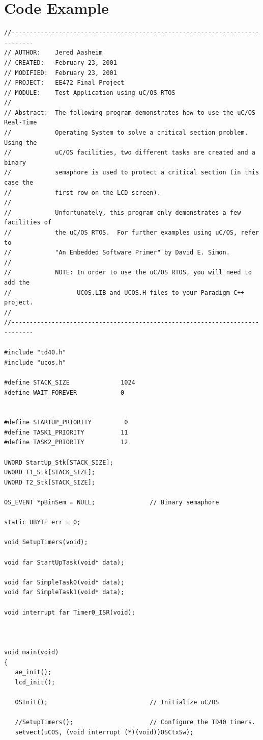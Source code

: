 \documentclass{article}	%
\begin{document}
\section{Code Example}
\begin{verbatim}
//----------------------------------------------------------------------------
// AUTHOR:    Jered Aasheim
// CREATED:   February 23, 2001
// MODIFIED:  February 23, 2001
// PROJECT:   EE472 Final Project
// MODULE:    Test Application using uC/OS RTOS
//
// Abstract:  The following program demonstrates how to use the uC/OS Real-Time
//            Operating System to solve a critical section problem.  Using the
//            uC/OS facilities, two different tasks are created and a binary
//            semaphore is used to protect a critical section (in this case the
//            first row on the LCD screen).
//
//            Unfortunately, this program only demonstrates a few facilities of
//            the uC/OS RTOS.  For further examples using uC/OS, refer to
//            "An Embedded Software Primer" by David E. Simon.
//
//            NOTE: In order to use the uC/OS RTOS, you will need to add the
//                  UCOS.LIB and UCOS.H files to your Paradigm C++ project.
//
//----------------------------------------------------------------------------

#include "td40.h"
#include "ucos.h"

#define STACK_SIZE              1024
#define WAIT_FOREVER            0


#define STARTUP_PRIORITY         0
#define TASK1_PRIORITY          11
#define TASK2_PRIORITY          12

UWORD StartUp_Stk[STACK_SIZE];
UWORD T1_Stk[STACK_SIZE];
UWORD T2_Stk[STACK_SIZE];

OS_EVENT *pBinSem = NULL;               // Binary semaphore

static UBYTE err = 0;

void SetupTimers(void);

void far StartUpTask(void* data);

void far SimpleTask0(void* data);
void far SimpleTask1(void* data);

void interrupt far Timer0_ISR(void);



void main(void)
{
   ae_init();
   lcd_init();

   OSInit();                            // Initialize uC/OS

   //SetupTimers();                     // Configure the TD40 timers.
   setvect(uCOS, (void interrupt (*)(void))OSCtxSw);


\end{verbatim}
\end{document}
